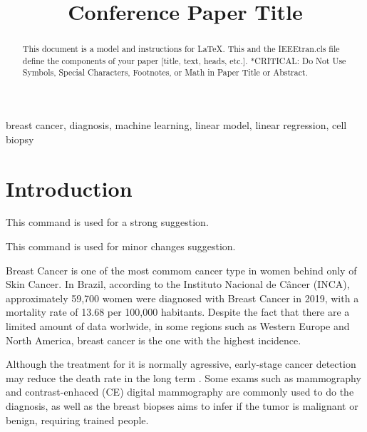 \documentclass[conference]{IEEEtran}
\newcommand{\reviewNormal}[1]{{\color{yellow} #1}} %
\newcommand{\reviewMinor}[1]{{\color{green} #1}} %
\begin{document}
\title{Conference Paper Title}

\author{
\and
{}
}

\maketitle

\begin{abstract}
This document is a model and instructions for \LaTeX.
This and the IEEEtran.cls file define the components of your paper [title, text, heads, etc.]. *CRITICAL: Do Not Use Symbols, Special Characters, Footnotes, 
or Math in Paper Title or Abstract.
\end{abstract}

\begin{IEEEkeywords}
breast cancer, diagnosis, machine learning, linear model, linear regression, cell biopsy
\end{IEEEkeywords}

\section{Introduction}



\reviewNormal{This command is used for a strong suggestion.}

\reviewMinor{This command is used for minor changes suggestion.}

Breast Cancer is one of the most commom cancer type in women behind only of Skin Cancer. In Brazil, according to 
the Instituto Nacional de Câncer (INCA), approximately 59,700 women were diagnosed
with Breast Cancer in 2019, with a mortality rate of 13.68 per 100,000 habitants. 
Despite the fact that there are a limited amount of data worlwide, in some regions such as Western Europe and North America,
breast cancer is the one with the highest incidence.

Although the treatment for it is normally agressive, early-stage cancer detection may reduce the death rate in the long term \cite{b1}. 
Some exams such as mammography and contrast-enhaced (CE) digital mammography are commonly used to do the diagnosis, 
as well as the breast biopses aims to infer if the tumor is malignant or benign, requiring trained people. 
\end{document}
